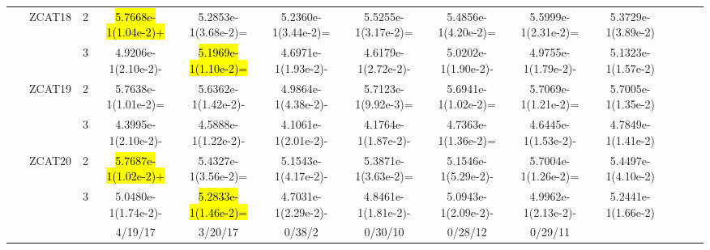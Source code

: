 \documentclass[a4paper,fleqn]{cas-dc}
\newcommand{\highlight}[1]{
	\begingroup
	\sethlcolor{Seashell}%
	\hl{#1}%
	\endgroup
}
\begin{document}
\begin{sloppypar}
\begin{table}[ht]
{\begin{tabular}{ccccccccccccc}
					
					
					
					
					
					\multirow{12}{*}{~}&\multirow{2}{*}{ZCAT18}&2 &\highlight{5.7668e-1(1.04e-2)+} &5.2853e-1(3.68e-2)=	&5.2360e-1(3.44e-2)=	&5.5255e-1(3.17e-2)=	&5.4856e-1(4.20e-2)=	&5.5999e-1(2.31e-2)=	&5.3729e-1(3.89e-2)\\
					
					\multirow{12}{*}{~}&\multirow{2}{*}{~}&3 &4.9206e-1(2.10e-2)-	&\highlight{5.1969e-1(1.10e-2)=}	&4.6971e-1(1.93e-2)-	&4.6179e-1(2.72e-2)-	&5.0202e-1(1.90e-2)-	&4.9755e-1(1.79e-2)-	&5.1323e-1(1.57e-2)\\
					
					
					
					
					
					
					
					
					
					
					\multirow{12}{*}{~}&\multirow{2}{*}{ZCAT19}&2 &5.7638e-1(1.01e-2)= &5.6362e-1(1.42e-2)-	&4.9864e-1(4.38e-2)-	&5.7123e-1(9.92e-3)=	&5.6941e-1(1.02e-2)=	&5.7069e-1(1.21e-2)=	&5.7005e-1(1.35e-2)\\
					
					\multirow{12}{*}{~}&\multirow{2}{*}{~}&3 &4.3995e-1(2.10e-2)- &4.5888e-1(1.22e-2)-	&4.1061e-1(2.01e-2)-	&4.1764e-1(1.87e-2)-	&4.7363e-1(1.36e-2)=	&4.6445e-1(1.53e-2)-	&4.7849e-1(1.41e-2)\\
					
					
					
					\multirow{12}{*}{~}&\multirow{2}{*}{ZCAT20}&2 &\highlight{5.7687e-1(1.02e-2)+}	&5.4327e-1(3.56e-2)=	&5.1543e-1(4.17e-2)-	&5.3871e-1(3.63e-2)=	&5.1546e-1(5.29e-2)-	&5.7004e-1(1.26e-2)=	&5.4497e-1(4.10e-2)\\
					
					\multirow{12}{*}{~}&\multirow{2}{*}{~}&3	&5.0480e-1(1.74e-2)-		&\highlight{5.2833e-1(1.46e-2)=}	&4.7031e-1(2.29e-2)-	&4.8461e-1(1.81e-2)-	&5.0943e-1(2.09e-2)-	&4.9962e-1(2.13e-2)-	&5.2441e-1(1.66e-2)\\
					
					
					
					
					\hline
					$+/-/\approx$&~&~&4/19/17 	&3/20/17	&0/38/2	&0/30/10	&0/28/12	&0/29/11
					&~ \\
					
					\hline
				\end{tabular}
			}
		\end{table}
		





\end{sloppypar}
\end{document}
